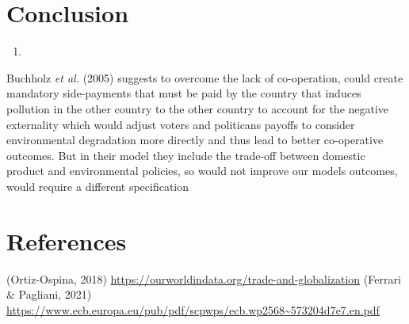 \documentclass[11pt,preprint, authoryear]{elsarticle}
\numberwithin{equation}{section}
\numberwithin{figure}{section}
\numberwithin{table}{section}
\def\tightlist{} %
\begin{document}
\hypertarget{conclusion}{%
\section{Conclusion}\label{conclusion}}

\begin{enumerate}
\def\labelenumi{(\arabic{enumi})}
\setcounter{enumi}{799}
\tightlist
\item
\end{enumerate}

Buchholz \emph{et al.} (2005) suggests to overcome the lack of
co-operation, could create mandatory side-payments that must be paid by
the country that induces pollution in the other country to the other
country to account for the negative externality which would adjust
voters and politicans payoffs to consider environmental degradation more
directly and thus lead to better co-operative outcomes. But in their
model they include the trade-off between domestic product and
environmental policies, so would not improve our models outcomes, would
require a different specification

\newpage

\hypertarget{references}{%
\section*{References}\label{references}}

(Ortiz-Ospina, 2018)
\url{https://ourworldindata.org/trade-and-globalization} (Ferrari \&
Pagliani, 2021)
\url{https://www.ecb.europa.eu/pub/pdf/scpwps/ecb.wp2568~573204d7e7.en.pdf}


\end{document}
